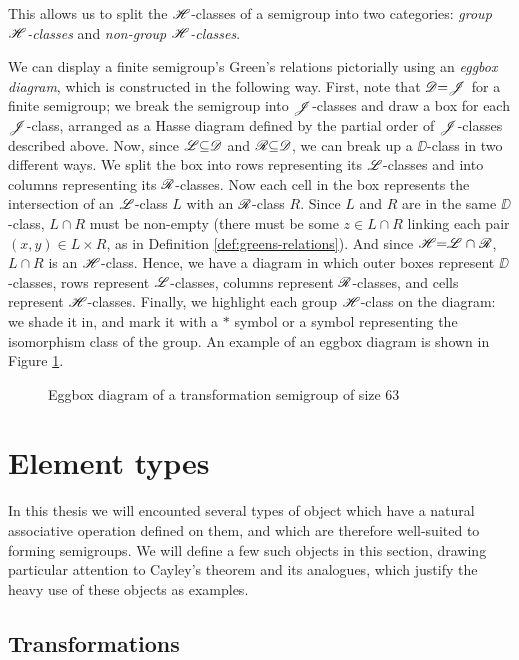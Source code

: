 This allows us to split the $\mathrel{\mathscr{H}}$-classes of a semigroup into two categories:
\textit{group $\mathrel{\mathscr{H}}$-classes} and \textit{non-group $\mathrel{\mathscr{H}}$-classes}.

We can display a finite semigroup's Green's relations pictorially using an
\textit{eggbox diagram}, which is constructed in the following way.  First, note
that $\mathrel{\mathscr{D}} = \mathrel{\mathscr{J}}$ for a finite semigroup; we break the semigroup into
$\mathrel{\mathscr{J}}$-classes and draw a box for each $\mathrel{\mathscr{J}}$-class, arranged as a Hasse diagram
defined by the partial order of $\mathrel{\mathscr{J}}$-classes described above.  Now, since
$\mathrel{\mathscr{L}} \subseteq \mathrel{\mathscr{D}}$ and $\mathrel{\mathscr{R}} \subseteq \mathrel{\mathscr{D}}$, we can break up a $\DD$-class in
two different ways.  We split the box into rows representing its $\mathrel{\mathscr{L}}$-classes
and into columns representing its $\mathrel{\mathscr{R}}$-classes.  Now each cell in the box
represents the intersection of an $\mathrel{\mathscr{L}}$-class $L$ with an $\mathrel{\mathscr{R}}$-class $R$.
Since $L$ and $R$ are in the same $\DD$-class, $L \cap R$ must be non-empty
(there must be some $z \in L \cap R$ linking each pair $(x,y) \in L \times R$,
as in Definition \ref{def:greens-relations}).  And since $\mathrel{\mathscr{H}} = \mathrel{\mathscr{L}} \cap \mathrel{\mathscr{R}}$,
$L \cap R$ is an $\mathrel{\mathscr{H}}$-class.  Hence, we have a diagram in which outer boxes
represent $\DD$-classes, rows represent $\mathrel{\mathscr{L}}$-classes, columns represent
$\mathrel{\mathscr{R}}$-classes, and cells represent $\mathrel{\mathscr{H}}$-classes.  Finally, we highlight each
group $\mathrel{\mathscr{H}}$-class on the diagram: we shade it in, and mark it with a $*$ symbol
or a symbol representing the isomorphism class of the group.  An example of an
eggbox diagram is shown in Figure \ref{fig:eggbox-diagram}.

\begin{figure}[p]
  \centering
  
  \caption{Eggbox diagram of a transformation semigroup of size 63}
  \label{fig:eggbox-diagram}
\end{figure}

\section{Element types}
\label{sec:element-types}

In this thesis we will encounted several types of object which have a natural
associative operation defined on them, and which are therefore well-suited to
forming semigroups.  We will define a few such objects in this section, drawing
particular attention to Cayley's theorem and its analogues, which justify the
heavy use of these objects as examples.

\subsection{Transformations}
\label{sec:transformations}

